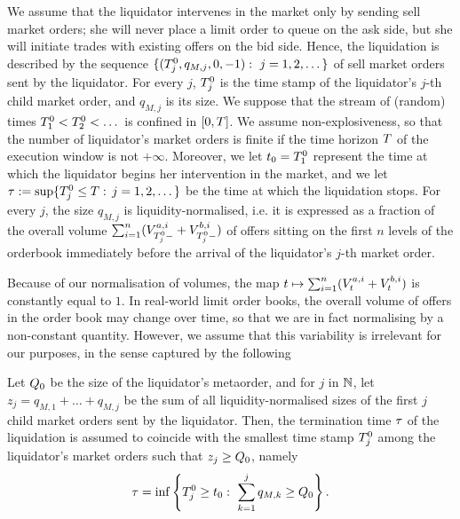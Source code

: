 \documentclass[10pt, article,table]{article}
\begin{document}
We assume that the liquidator intervenes in the market only by sending sell market orders; she will never place a limit order to queue on the ask side, but she will initiate trades with existing offers on the bid side. 
Hence, the liquidation is described by the sequence $\lbrace (\arrivalTimes[0]_j, q_{M,j},0,-1): \, \, j=1,2,\dots \rbrace$ of sell market orders sent by the liquidator. For every $j$, $\arrivalTimes[0]_j$ is the time stamp of the liquidator's $j$-th child market order, and $q_{M,j}$ is its size. 
We suppose that the stream of (random) times $\arrivalTimes[0]_1 < \arrivalTimes[0]_2 < \dots$ is confined in $\timeWindow$. We assume non-explosiveness, so that the number of liquidator's market orders is finite if the time horizon $\timeHorizon$ of the execution window is not $+\infty$. Moreover, we let $\initialTime = \arrivalTimes[0]_1$ represent the time at which the liquidator begins her intervention in the market, and we let $\terminationTime:=\sup\lbrace\arrivalTimes[0]_j\leq\timeHorizon: \, j=1,2,\dots\rbrace$ be the time at which the liquidation stops. 
For every $j$, the size $q_{M,j}$ is liquidity-normalised, i.e. it is expressed as a fraction of the overall volume $\sum_{i=1}^{n}(\nthBestAskVolume[i]_{\arrivalTimes[0]_j-} + \nthBestBidVolume[i]_{\arrivalTimes[0]_j-})$ of offers sitting on the first $n$ levels of the orderbook immediately before the arrival of the liquidator's $j$-th market order.

Because of our normalisation of volumes, the map  $t\mapsto \sum_{i=1}^{n}(\nthBestAskVolume[i]_t +\nthBestBidVolume[i]_t)$ is constantly equal to $1$. In real-world limit order books, the overall volume of offers in the order book may change over time, so that we are in fact normalising by a non-constant quantity. However, we assume that this variability is irrelevant for our purposes, in the sense captured by the following 
\begin{assumption}\label{assumption.termination-time_of_liquidation}
Let $\metaorderSize$ be the size of the liquidator's metaorder, and for $j$ in $\N$,  let $z_j = q_{M,1}+\dots+q_{M,j}$ be the sum of all liquidity-normalised sizes of the first $j$ child market orders sent by the liquidator. Then, the termination time $\terminationTime$ of the liquidation is assumed to coincide with the smallest time stamp $\arrivalTimes[0]_j$ among the liquidator's market orders such that $z_j \geq \metaorderSize$, namely
 \begin{equation*}
\terminationTime = \inf\left\lbrace \arrivalTimes[0]_j \geq \initialTime : \, \, 
 \sum_{k=1}^{j} q_{M,k} \geq \metaorderSize \right\rbrace.
 \end{equation*}
\end{assumption}
\end{document}
